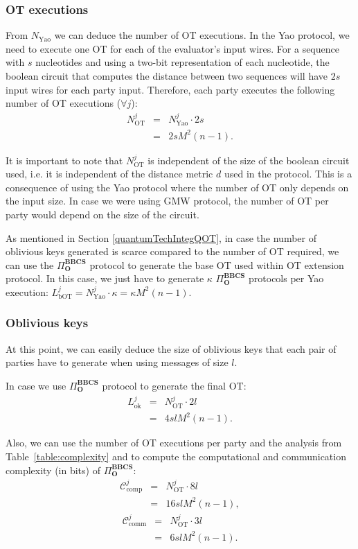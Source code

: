 \subsubsection{OT executions}
From $N_{\text{Yao}}$ we can deduce the number of OT executions. In the Yao protocol, we need to execute one OT for each of the evaluator's input wires. For a sequence with $s$ nucleotides and using a two-bit representation of each nucleotide, the boolean circuit that computes the distance between two sequences will have $2s$ input wires for each party input. Therefore, each party executes the following number of OT executions ($\forall j$):
\begin{eqnarray*}
N_{\text{OT}}^j &=& N^j_\text{Yao} \cdot 2s \\
&=& 2sM^2(n-1).
\end{eqnarray*}

It is important to note that $N_{\text{OT}}^j$ is independent of the size of the boolean circuit used, i.e. it is independent of the distance metric $d$ used in the protocol. This is a consequence of using the Yao protocol where the number of OT only depends on the input size. In case we were using GMW \cite{Goldreich87} protocol, the number of OT per party would depend on the size of the circuit.

As mentioned in Section \ref{quantumTechIntegQOT}, in case the number of oblivious keys generated is scarce compared to the number of OT required, we can use the $\Pi^{\textbf{BBCS}}_{\textbf{O}}$ protocol to generate the base OT used within OT extension protocol. In this case, we just have to generate $\kappa$ $\Pi^{\textbf{BBCS}}_{\textbf{O}}$ protocols per Yao execution: $L^j_\text{bOT} = N^j_\text{Yao} \cdot \kappa = \kappa M^2(n-1)$.

\subsubsection{Oblivious keys}
At this point, we can easily deduce the size of oblivious keys that each pair of parties have to generate when using messages of size $l$. 

In case we use $\Pi^{\textbf{BBCS}}_{\textbf{O}}$ protocol to generate the final OT:
\begin{eqnarray*}
L^j_{\text{ok}} &=& N_{\text{OT}}^j \cdot 2l \\
&=& 4slM^2(n-1).
\end{eqnarray*}

Also, we can use the number of OT executions per party and the analysis from Table~\ref{table:complexity} and \cite{SPM21} to compute the computational and communication complexity (in bits) of $\Pi^{\textbf{BBCS}}_{\textbf{O}}$:
\begin{eqnarray*}
\mathcal{C}^j_{\text{comp}} &=&  N_{\text{OT}}^j \cdot 8l \\
&=& 16 slM^2(n-1),
\end{eqnarray*}
\begin{eqnarray*}
\mathcal{C}^j_{\text{comm}} &=&  N_{\text{OT}}^j \cdot 3l \\
&=& 6 slM^2(n-1).
\end{eqnarray*}

